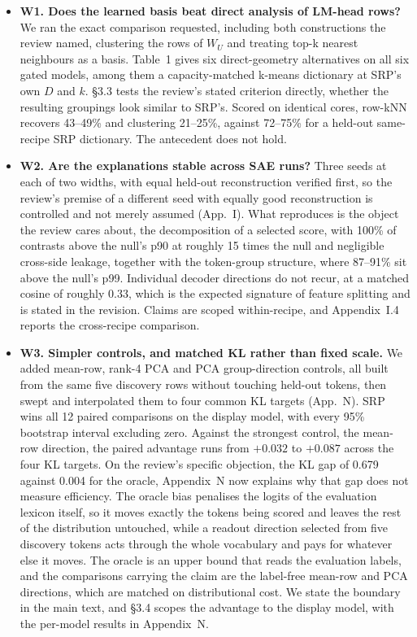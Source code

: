 \documentclass[11pt]{article}
\begin{document}
\begin{itemize}
\item \textbf{W1. Does the learned basis beat direct analysis of LM-head
rows?} We ran the exact comparison requested, including both constructions
the review named, clustering the rows of $W_U$ and treating top-k nearest
neighbours as a basis. Table~1 gives six direct-geometry
alternatives on all six gated models, among them a capacity-matched k-means
dictionary at SRP's own $D$ and $k$. \S3.3 tests the review's
stated criterion directly, whether the resulting groupings look similar to
SRP's. Scored on identical cores, row-kNN recovers 43--49\% and clustering
21--25\%, against 72--75\% for a held-out same-recipe SRP dictionary. The
antecedent does not hold.

\item \textbf{W2. Are the explanations stable across SAE runs?} Three seeds
at each of two widths, with equal held-out reconstruction verified first, so
the review's premise of a different seed with equally good reconstruction is
controlled and not merely assumed (App.~I). What reproduces is the object the
review cares about, the decomposition of a selected score, with 100\% of
contrasts above the null's p90 at roughly 15 times the null and negligible
cross-side leakage, together with the token-group structure, where 87--91\%
sit above the null's p99. Individual decoder directions do not recur, at a
matched cosine of roughly 0.33, which is the expected signature of feature
splitting and is stated in the revision. Claims are scoped within-recipe, and
Appendix~I.4 reports the cross-recipe comparison.

\item \textbf{W3. Simpler controls, and matched KL rather than fixed scale.}
We added mean-row, rank-4 PCA and PCA group-direction controls, all built
from the same five discovery rows without touching held-out tokens, then
swept and interpolated them to four common KL targets (App.~N). SRP wins all
12 paired comparisons on the display model, with every 95\% bootstrap
interval excluding zero. Against the strongest control, the mean-row
direction, the paired advantage runs from $+0.032$ to $+0.087$ across the
four KL targets. On the review's specific objection, the KL gap of 0.679
against 0.004 for the oracle, Appendix~N now explains why that gap does not
measure efficiency. The oracle bias penalises the logits of the evaluation
lexicon itself, so it moves exactly the tokens being scored and leaves the
rest of the distribution untouched, while a readout direction selected from
five discovery tokens acts through the whole vocabulary and pays for whatever
else it moves. The oracle is an upper bound that reads the evaluation labels,
and the comparisons carrying the claim are the label-free mean-row and PCA
directions, which are matched on distributional cost. We state the boundary
in the main text, and \S3.4 scopes the advantage to the display
model, with the per-model results in Appendix~N.


\end{itemize}
\end{document}
